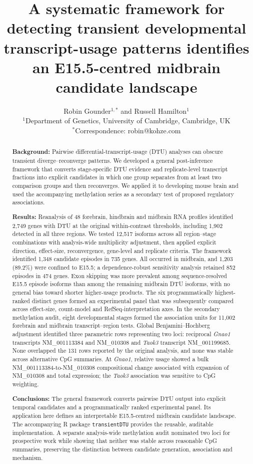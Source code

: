 \documentclass[11pt,a4paper]{article}
\title{\textbf{A systematic framework for detecting transient developmental transcript-usage patterns identifies an E15.5-centred midbrain candidate landscape}}
\author{Robin Gounder$^{1,*}$ and Russell Hamilton$^{1}$\\\small $^{1}$Department of Genetics, University of Cambridge, Cambridge, UK\\\small $^{*}$Correspondence: robin@kohze.com}
\date{}
\begin{document}
\ifdefined\submissionformat
\doublespacing
\fi
\maketitle

\begin{abstract}
\textbf{Background:} Pairwise differential-transcript-usage (DTU) analyses can obscure transient diverge--reconverge patterns. We developed a general post-inference framework that converts stage-specific DTU evidence and replicate-level transcript fractions into explicit candidates in which one group separates from at least two comparison groups and then reconverges. We applied it to developing mouse brain and used the accompanying methylation series as a secondary test of proposed regulatory associations.

\textbf{Results:} Reanalysis of 48 forebrain, hindbrain and midbrain RNA profiles identified 2,749 genes with DTU at the original within-contrast thresholds, including 1,902 detected in all three regions. We tested 12,517 isoforms across all region--stage combinations with analysis-wide multiplicity adjustment, then applied explicit direction, effect-size, reconvergence, gene-level and replicate criteria. The framework identified 1,348 candidate episodes in 735 genes. All occurred in midbrain, and 1,203 (89.2\%) were confined to E15.5; a dependence-robust sensitivity analysis retained 852 episodes in 474 genes. Exon skipping was more prevalent among sequence-resolved E15.5 episode isoforms than among the remaining midbrain DTU isoforms, with no general bias toward shorter higher-usage products. The six programmatically highest-ranked distinct genes formed an experimental panel that was subsequently compared across effect-size, count-model and RefSeq-interpretation axes. In the secondary methylation audit, eight developmental stages formed the association units for 11,002 forebrain and midbrain transcript--region tests. Global Benjamini--Hochberg adjustment identified three parametric rows representing two loci: reciprocal \textit{Gnao1} transcripts NM\_001113384 and NM\_010308 and \textit{Taok3} transcript NM\_001199685. None overlapped the 131 rows reported by the original analysis, and none was stable across alternative CpG summaries. At \textit{Gnao1}, relative usage showed a bulk NM\_001113384-to-NM\_010308 compositional change associated with expansion of NM\_010308 and total expression; the \textit{Taok3} association was sensitive to CpG weighting.

\textbf{Conclusions:} The general framework converts pairwise DTU output into explicit temporal candidates and a programmatically ranked experimental panel. Its application here defines an interpretable E15.5-centred midbrain candidate landscape. The accompanying R package \texttt{transientDTU} provides the reusable, auditable implementation. A separate analysis-wide methylation audit nominated two loci for prospective work while showing that neither was stable across reasonable CpG summaries, preserving the distinction between candidate generation, association and mechanism.
\end{abstract}
\end{document}
